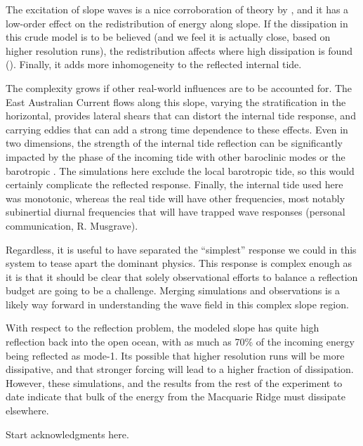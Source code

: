 \documentclass[10pt]{article}
\begin{document}
The excitation of slope waves is a nice corroboration of theory by \citet{daleetal01}, and it has a low-order effect on the redistribution of energy along slope.  If the dissipation in this crude model is to be believed (and we feel it is actually close, based on higher resolution runs), the redistribution affects where high dissipation is found ().  Finally, it adds more inhomogeneity to the reflected internal tide.    

The complexity grows if other real-world influences are to be accounted for.  The East Australian Current flows along this slope, varying the stratification in the horizontal, provides lateral shears that can distort the internal tide response, and carrying eddies that can add a strong time dependence to these effects.  Even in two dimensions, the strength of the  internal tide reflection can be significantly impacted by the phase of the incoming tide with other baroclinic modes \citet{klymaketal11a} or the barotropic \citep{kellynash10}.
The simulations here exclude the local barotropic tide, so this would certainly complicate the reflected response.  Finally, the internal tide used here was monotonic, whereas the real tide will have other frequencies, most notably subinertial diurnal frequencies that will have trapped wave responses (personal communication, R. Musgrave).  

Regardless, it is useful to have separated the ``simplest'' response we could in this system to tease apart the dominant physics.  This response is complex enough as it is that it should be clear that solely observational efforts to balance a reflection budget are going to be a challenge.  Merging simulations and observations is a likely way forward in understanding the wave field in this complex slope region.

With respect to the reflection problem, the modeled slope has quite high reflection back into the open ocean, with as much as 70\% of the incoming energy being reflected as mode-1.  Its possible that higher resolution runs will be more dissipative, and that stronger forcing will lead to a higher fraction of dissipation.  However, these simulations, and the results from the rest of the experiment to date \citep[i.e.][]{johnstonetal15} indicate that bulk of the energy from the Macquarie Ridge must dissipate elsewhere.  

\begin{acknowledgment} 
Start acknowledgments here.
\end{acknowledgment}
\end{document}
